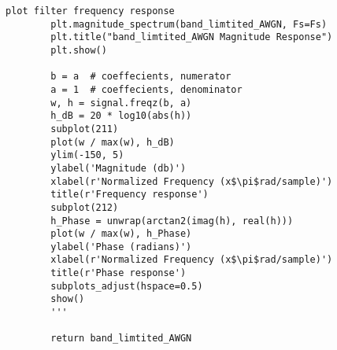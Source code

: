 \begin{lstlisting}[breaklines]
        plot filter frequency response
        plt.magnitude_spectrum(band_limtited_AWGN, Fs=Fs)
        plt.title("band_limtited_AWGN Magnitude Response")
        plt.show()
        
        b = a  # coeffecients, numerator
        a = 1  # coeffecients, denominator
        w, h = signal.freqz(b, a)
        h_dB = 20 * log10(abs(h))
        subplot(211)
        plot(w / max(w), h_dB)
        ylim(-150, 5)
        ylabel('Magnitude (db)')
        xlabel(r'Normalized Frequency (x$\pi$rad/sample)')
        title(r'Frequency response')
        subplot(212)
        h_Phase = unwrap(arctan2(imag(h), real(h)))
        plot(w / max(w), h_Phase)
        ylabel('Phase (radians)')
        xlabel(r'Normalized Frequency (x$\pi$rad/sample)')
        title(r'Phase response')
        subplots_adjust(hspace=0.5)
        show()
        '''

        return band_limtited_AWGN
\end{lstlisting}


